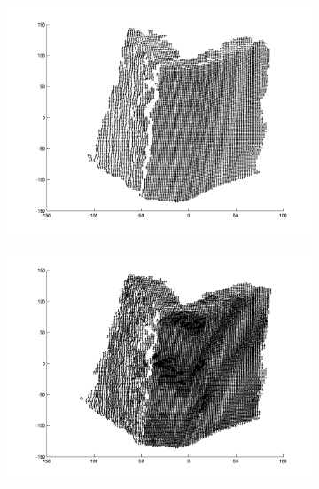 \begin{figure}[H]
	\centering
	
	\begin{subfigure}[b]{0.3\textwidth}
		\centering
		\includegraphics[width=\textwidth]{Images/Book1.png}
		\caption{}
	\end{subfigure}%
	\begin{subfigure}[b]{0.3\textwidth}
		\centering
		\includegraphics[width=\textwidth]{Images/Book2.png}
		\caption{}
	\end{subfigure}
	\begin{subfigure}[b]{0.3\textwidth}
		\centering

\end{subfigure}
\end{figure}
